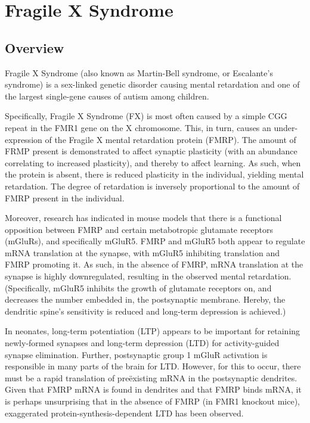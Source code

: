 

\section{Fragile X Syndrome}

\subsection{Overview}
Fragile X Syndrome (also known as Martin-Bell syndrome, or Escalante's syndrome) is a sex-linked genetic disorder causing mental retardation and one of the largest single-gene causes of autism among children.

Specifically, Fragile X Syndrome (FX) is most often caused by a simple CGG repeat in the FMR1 gene on the X chromosome. This, in turn, causes an under-expression of the Fragile X mental retardation protein (FMRP). The amount of FRMP present is demonstrated to affect synaptic plasticity (with an abundance correlating to increased plasticity), and thereby to affect learning. As such, when the protein is absent, there is reduced plasticity in the individual, yielding mental retardation. The degree of retardation is inversely proportional to the amount of FMRP present in the individual.

Moreover, research has indicated in mouse models that there is a functional opposition between FMRP and certain metabotropic glutamate receptors (mGluRs), and specifically mGluR5. FMRP and mGluR5 both appear to regulate mRNA translation at the synapse, with mGluR5 inhibiting translation and FMRP promoting it. As such, in the absence of FMRP, mRNA translation at the synapse is highly downregulated, resulting in the observed mental retardation. (Specifically, mGluR5 inhibits the growth of glutamate receptors on, and decreases the number embedded in, the postsynaptic membrane. Hereby, the dendritic spine's sensitivity is reduced and long-term depression is achieved.)

In neonates, long-term potentiation (LTP) appears to be important for retaining newly-formed synapses and long-term depression (LTD) for activity-guided synapse elimination. Further, postsynaptic group 1 mGluR activation is responsible in many parts of the brain for LTD. However, for this to occur, there must be a rapid translation of pre\"{e}xisting mRNA in the postsynaptic dendrites. Given that FMRP mRNA is found in dendrites and that FMRP binds mRNA, it is perhaps unsurprising that in the absence of FMRP (in FMR1 knockout mice), exaggerated protein-synthesis-dependent LTD has been observed.

